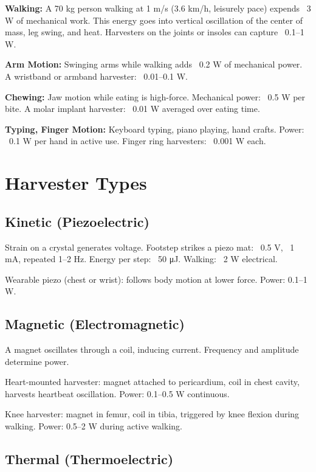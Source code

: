 \documentclass[12pt]{article}
\begin{document}
\textbf{Walking:} A 70 kg person walking at 1 m/s (3.6 km/h, leisurely pace) expends ~3 W of mechanical work. This energy goes into vertical oscillation of the center of mass, leg swing, and heat. Harvesters on the joints or insoles can capture ~0.1–1 W.

\textbf{Arm Motion:} Swinging arms while walking adds ~0.2 W of mechanical power. A wristband or armband harvester: ~0.01–0.1 W.

\textbf{Chewing:} Jaw motion while eating is high-force. Mechanical power: ~0.5 W per bite. A molar implant harvester: ~0.01 W averaged over eating time.

\textbf{Typing, Finger Motion:} Keyboard typing, piano playing, hand crafts. Power: ~0.1 W per hand in active use. Finger ring harvesters: ~0.001 W each.

\section{Harvester Types}

\subsection{Kinetic (Piezoelectric)}

Strain on a crystal generates voltage. Footstep strikes a piezo mat: ~0.5 V, ~1 mA, repeated 1–2 Hz. Energy per step: ~50 μJ. Walking: ~2 W electrical.

Wearable piezo (chest or wrist): follows body motion at lower force. Power: 0.1–1 W.

\subsection{Magnetic (Electromagnetic)}

A magnet oscillates through a coil, inducing current. Frequency and amplitude determine power.

Heart-mounted harvester: magnet attached to pericardium, coil in chest cavity, harvests heartbeat oscillation. Power: 0.1–0.5 W continuous.

Knee harvester: magnet in femur, coil in tibia, triggered by knee flexion during walking. Power: 0.5–2 W during active walking.

\subsection{Thermal (Thermoelectric)}
\end{document}
